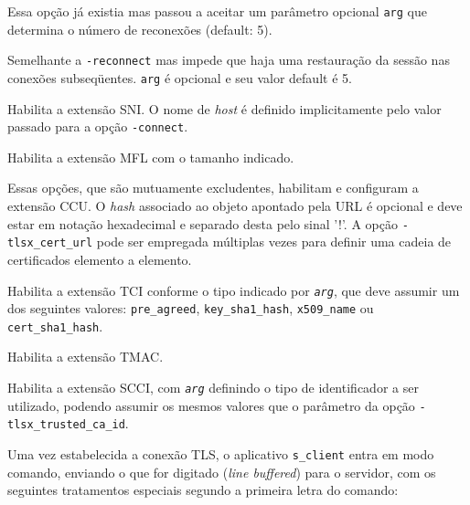 \begin{description}[\breaklabel\setlabelstyle{\ttfamily}]

\item[-reconnect \textit{arg}]
	Essa opção já existia mas passou a aceitar um parâmetro opcional \verb|arg| que 
	determina o número de reconexões (default: 5).

\item[-reinit \textit{arg}]
	Semelhante a \verb|-reconnect| mas impede que haja uma restauração da 
	sessão nas conexões subseqüentes. \verb|arg| é opcional e seu valor default é 5.

\item[-tlsx\_server\_name]
	Habilita a extensão \acl{SNI}. O nome de \emph{host} é
	definido implicitamente pelo valor passado para a opção \verb|-connect|.

\item[-tlsx\_max\_fragment\_length \textit{length}]
	Habilita a extensão \acl{MFL} com o tamanho indicado.

\item[-tlsx\_cert\_url  \textit{url!hash}]
\item[-tlsx\_pkipath\_url  \textit{url!hash}]
	Essas opções, que são mutuamente excludentes, habilitam e configuram a 
	extensão \acl{CCU}. O \emph{hash} associado ao objeto
	apontado pela \acs{URL} é opcional e deve estar em notação hexadecimal e
	separado desta pelo sinal '!'.
	A opção \verb|-tlsx_cert_url| pode ser empregada múltiplas vezes para definir
	uma cadeia de certificados elemento a elemento.

\item[-tlsx\_trusted\_ca\_id \textit{arg}]
	Habilita a extensão \acl{TCI} conforme o tipo indicado por 
	{\tt\itshape arg}, que deve assumir um dos seguintes valores: \verb|pre_agreed|, 
	\verb|key_sha1_hash|, \verb|x509_name| ou \verb|cert_sha1_hash|.

\item[-tlsx\_truncated\_hmac]
	Habilita a extensão \acl{TMAC}.

\item[-tlsx\_server\_cert\_id \textit{arg}]
	Habilita a extensão \acl{SCCI}, com
	{\tt\itshape arg} definindo o tipo de identificador a ser utilizado, podendo assumir
	os mesmos valores que o parâmetro da opção \verb|-tlsx_trusted_ca_id|.

\end{description}

Uma vez estabelecida a conexão TLS, o aplicativo \verb|s_client| entra em modo
comando, enviando o que for digitado (\emph{line buffered}) para o servidor,
com os seguintes tratamentos especiais segundo a primeira letra do comando: 

